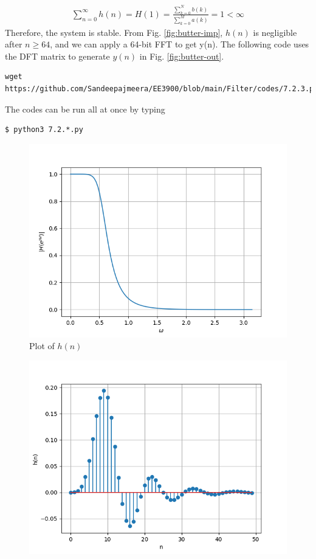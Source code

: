 \documentclass[journal,12pt,twocolumn]{IEEEtran}
\renewcommand\thesection{\arabic{section}}
\begin{document}
\begin{enumerate}[label=\thesection.\arabic*]
\begin{align}
	\sum_{n = 0}^{\infty}h(n) = H(1) = \frac{\sum_{k = 0}^{N}b(k)}{\sum_{k = 0}^{M}a(k)} = 1 < \infty
\end{align}
Therefore, the system is stable. From
Fig. \eqref{fig:butter-imp}, $h(n)$ is negligible after $n \geq 64$, and we
can apply a 64-bit FFT to get y(n). The following code uses the DFT matrix
to generate $y(n)$ in Fig. \eqref{fig:butter-out}.
\begin{lstlisting}
wget https://github.com/Sandeepajmeera/EE3900/blob/main/Filter/codes/7.2.3.py
\end{lstlisting}
The codes can be run all at once by typing
\begin{lstlisting}
$ python3 7.2.*.py
\end{lstlisting}
\begin{figure}[!htb]
	\includegraphics[width=\columnwidth]{figs/7.2.1.png}
	\caption{Plot of $h(n)$}
	\label{fig:butter-imp}
\end{figure}
\begin{figure}[!htb]
	\includegraphics[width=\columnwidth]{figs/7.2.2.png}

\end{figure}
\end{enumerate}
\end{document}
